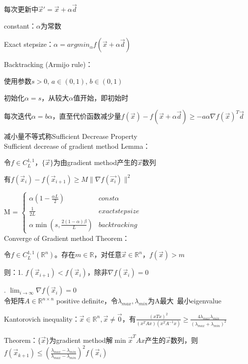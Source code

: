 \documentclass[UTF8]{ctexart}
\begin{document}
  每次更新中$\vec{x}' = \vec{x} + \alpha \vec{d}$

  constant：$\alpha$为常数

  Exact stepsize：$\alpha = argmin_{\alpha} f(\vec{x} + \alpha \vec{d})$

  Backtracking (Armijo rule)：

  \quad 使用参数$s > 0$, $a \in (0, 1)$, $b \in (0, 1)$

  \quad 初始化$\alpha = s$，从较大$\alpha$值开始，即初始时
  
  \quad 每次迭代$\alpha = b\alpha$，直至代价函数减少量$f(\vec{x}) - f(\vec{x} + \alpha \vec{d}) \geq -a\alpha \nabla f(\vec{x})^T\vec{d}$

  \quad \quad 减小量不等式称Sufficient Decrease Property\\
Sufficient decrease of gradient method Lemma：

  令$f \in C^{1,1}_L$，$\{\vec{x}\}$为由gradient method产生的$\vec{x}$数列

  有$f(\vec{x}_i) - f(\vec{x}_{i+1}) \geq M\|\nabla f(\vec{x_i})\|^2$

  \quad M = $\begin{cases}
    \alpha(1 - \frac{\alpha L}{2}) & const \alpha \\
    \frac{1}{2L} & exact stepsize \\
    \alpha\min(s, \frac{2(1 - \alpha)\beta}{L}) & backtracking
    \end{cases}$\\
Converge of Gradient method Theorem：

  令$f \in C^{1,1}_L(\mathbb{R}^n)$。存在$m \in \mathbb{R}$，对任意$\vec{x} \in \mathbb{R}^n$，$f(\vec{x}) > m$

  则：1. $f(\vec{x}_{i + 1}) < f(\vec{x}_i)$，除非$\nabla f(\vec{x}_i) = 0$

  . $\lim_{i \to \infty} \nabla f(\vec{x}_i) = 0$\\
令矩阵$A \in \mathbb{R}^{n \times n}$ positive definite，令$\lambda_{max}, \lambda_{min}$为A最大\ 最小eigenvalue

  Kantorovich inequality：$\vec{x} \in \mathbb{R}^n, \vec{x} \neq \vec{0}$，有$\frac{(xTx)^2}{(x^TAx)(x^TA^{-1}x)} \geq \frac{4\lambda_{max}\lambda_{min}}{(\lambda_{max} + \lambda_{min})^2}$

  Theorem：$\{\vec{x}\}$为gradient method解$\min \vec{x}^TAx$产生的$\vec{x}$数列，则$f(\vec{x}_{k + 1}) \leq (\frac{\lambda_{max} - \lambda_{min}}{\lambda_{max} - \lambda_{min}})^2f(\vec{x}_i)$
\end{document}
